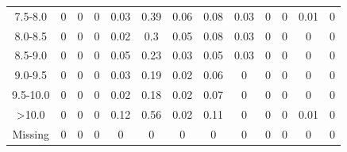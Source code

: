 \documentclass[12pt]{dforeport}
\begin{document}
\begin{landscape}
\begin{table}[ht]
\begin{tabular}{c | c c c c c | c c c c c c c}
7.5-8.0 & 0 & 0 & 0 & 0.03 & 0.39 & 0.06 & 0.08 & 0.03 & 0 & 0 & 0.01 & 0\\
8.0-8.5 & 0 & 0 & 0 & 0.02 & 0.3 & 0.05 & 0.08 & 0.03 & 0 & 0 & 0 & 0\\
8.5-9.0 & 0 & 0 & 0 & 0.05 & 0.23 & 0.03 & 0.05 & 0.03 & 0 & 0 & 0 & 0\\
9.0-9.5 & 0 & 0 & 0 & 0.03 & 0.19 & 0.02 & 0.06 & 0 & 0 & 0 & 0 & 0\\
9.5-10.0 & 0 & 0 & 0 & 0.02 & 0.18 & 0.02 & 0.07 & 0 & 0 & 0 & 0 & 0\\
>10.0& 0 & 0 & 0 & 0.12 & 0.56 & 0.02 & 0.11 & 0 & 0 & 0 & 0.01 & 0\\
Missing & 0 & 0 & 0 & 0 & 0 & 0 & 0 & 0 & 0 & 0 & 0 & 0\\
\bottomrule
\end{tabular}
\end{table}


\end{landscape}
\end{document}
